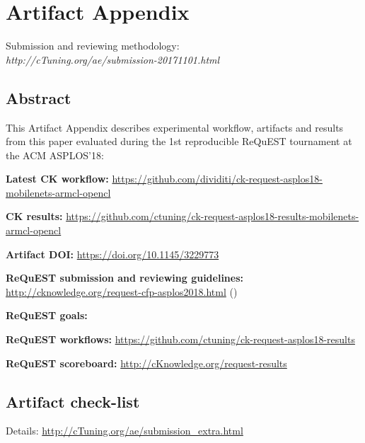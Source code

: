 \onecolumn

\section{Artifact Appendix}
\label{artifact_appendix}

Submission and reviewing methodology: \\
{\em http://cTuning.org/ae/submission-20171101.html}

\subsection{Abstract}

This Artifact Appendix describes experimental workflow,
artifacts and results from this paper evaluated 
during the 1st reproducible ReQuEST tournament at the ACM ASPLOS'18:

\begin{packed_itemize}
  \item {\bf Latest CK workflow:} \url{https://github.com/dividiti/ck-request-asplos18-mobilenets-armcl-opencl}
  \item {\bf CK results:} \url{https://github.com/ctuning/ck-request-asplos18-results-mobilenets-armcl-opencl}
  \item {\bf Artifact DOI:} \url{https://doi.org/10.1145/3229773}
  \item {\bf ReQuEST submission and reviewing guidelines:} \url{http://cknowledge.org/request-cfp-asplos2018.html} (\cite{request-asplos18})
  \item {\bf ReQuEST goals:} \cite{cm:29db2248aba45e59:0c7348dfbadd5b95}
  \item {\bf ReQuEST workflows:} \url{https://github.com/ctuning/ck-request-asplos18-results}
  \item {\bf ReQuEST scoreboard:} \url{http://cKnowledge.org/request-results}
\end{packed_itemize}

\subsection{Artifact check-list}

Details: \url{http://cTuning.org/ae/submission_extra.html}

